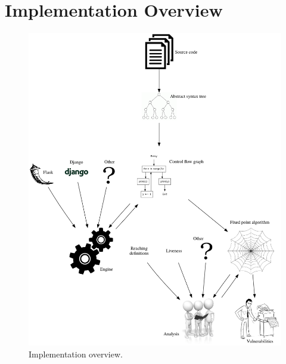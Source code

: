 \section{Implementation Overview}

\begin{figure}
  \includegraphics[width=\textwidth]{./figures/dot_files/implementation_overview.png}
  \caption{Implementation overview.}
  
\end{figure}
